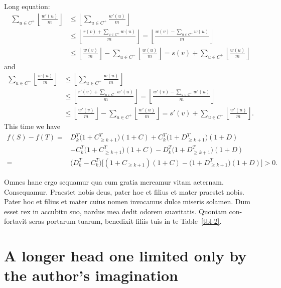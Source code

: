 \documentclass{infor}
\theoremstyle{remark}
\begin{document}
Long equation:
%
\begin{align}
\sum_{u\in C^+}\left\lfloor{\frac{w'(u)}{m}} \right\rfloor 
    & \le \left\lfloor\sum_{u\in C^+} {\frac{w'(u)}{m}} \right\rfloor \nonumber \\
    & \le \left\lfloor{\frac{r(v)+\sum_{u\in C^+} w(u)}{m}} \right \rfloor = \left\lfloor{\frac{w(v)-\sum_{u\in C^-} w(u)}{m}} \right \rfloor \nonumber \\
    & \le \left\lfloor{\frac{w(v)}{m}} \right\rfloor -\sum_{u\in C^-}\left\lfloor{\frac{w(u)}{m}} \right\rfloor = s(v)+\sum_{u\in C^+}\left\lfloor{\frac{w(u)}{m}} \right\rfloor
\end{align}
%
and
%
\begin{align}
\sum_{u\in C^-}\left\lfloor{\frac{w(u)}{m}} \right\rfloor
    & \le \left\lfloor\sum_{u\in C^-} {\frac{w(u)}{m}} \right\rfloor \nonumber \\
    & \le \left\lfloor{\frac{r'(v)+\sum_{u\in C^-} w'(u)}{m}} \right \rfloor = \left\lfloor{\frac{w'(v)-\sum_{u\in C^+} w'(u)}{m}} \right\rfloor \nonumber\\
    & \le \left\lfloor{\frac{w'(v)}{m}} \right\rfloor -\sum_{u\in C^+}\left\lfloor{\frac{w'(u)}{m}} \right\rfloor = s'(v)+\sum _{u\in C^-}\left\lfloor{\frac{w'(u)}{m}} \right\rfloor .
\end{align}
%
This time we have
%
\begin{align}
f(S)-f(T) = {} & D_k^T\bigl(1+C_{\geq k+1}^T\bigr)(1 + C) + C_k^T\bigl(1+D_{\geq k+1}^T\bigr)(1 + D) \nonumber    \\
            {} & - C_k^T\bigl(1+C_{\geq k+1}^T\bigr)(1 + C) - D_k^T\bigl (1+D_{\geq k+1}^T\bigr)(1 + D) \nonumber \\
          = {} & \bigl(D_k^T-C_k^T\bigr)\bigl[(1+C_{\geq k+1})(1+C)-\bigl (1+D_{\geq k+1}^T\bigr)(1+D)\bigr]>0.
\end{align}

Omnes hanc ergo sequamur qua cum gratia mereamur vitam aeternam.
Consequamur. Praestet nobis deus, pater hoc et filius et mater
praestet nobis.  Pater hoc et filius et mater cuius nomen invocamus
dulce miseris solamen. Dum esset rex in accubitu suo, nardus mea
dedit odorem suavitatis. Quoniam con-fortavit seras portarum tuarum,
benedixit filiis tuis in te Table~\ref{tbl-2}.



\section{A longer head one limited only by the author's imagination}
\end{document}
